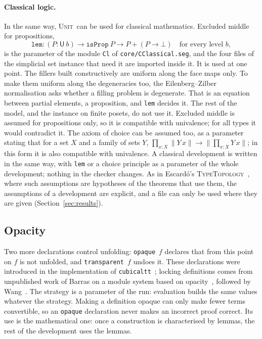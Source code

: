 \documentclass[11pt]{article}
\newcommand{\sys}{\textsc{Unit}}
\newcommand{\kw}[1]{\texttt{#1}}
\newcommand{\U}{\mathsf{U}}
\begin{document}
\paragraph{Classical logic.} In the same way, \sys\ can be used for
classical mathematics. Excluded middle for propositions,
\[
\kw{lem} : (P : \U\ b) \to \kw{isProp}\ P \to P + (P\to\bot)\quad
\text{for every level } b,
\]
is the parameter of the module \kw{Cl} of \texttt{core/CClassical.seg},
and the four files of the simplicial set instance that need it are
imported inside it.
It is used at one point. The fillers built constructively are uniform
along the face maps only. To make them uniform along the degeneracies
too, the Eilenberg--Zilber normalisation asks whether a filling problem
is degenerate. That is an equation between partial elements, a
proposition, and \kw{lem} decides it. The rest of the model, and the
instance on finite posets, do not use it. Excluded middle is assumed for
propositions only, so it is compatible with univalence; for all types
it would contradict it. The axiom of choice can be assumed too, as a parameter stating that for a set $X$ and a family of sets
$Y$, $\prod_{x:X}\lVert Y\,x\rVert\to\lVert\prod_{x:X}Y\,x\rVert$; in this
form it is also compatible with univalence. A classical development is written in the same
way, with \kw{lem} or a choice principle as a parameter of the whole
development; nothing in the checker changes. As in Escard\'o's
\textsc{TypeTopology}~\cite{TT}, where such assumptions are hypotheses
of the theorems that use them, the assumptions of a development are
explicit, and a file can only be used where they are given
(Section~\ref{sec:results}).

\subsection{Opacity}

Two more declarations control unfolding: \kw{opaque}~$f$ declares that
from this point on $f$ is not unfolded, and \kw{transparent}~$f$ undoes
it. These declarations were introduced in the implementation of
\texttt{cubicaltt}~\cite{cubicaltt}; locking definitions comes from
unpublished work of Barras on a module system based on
opacity~\cite{Barras}, followed by Wang~\cite{Wang}. The strategy is a parameter of the run:
evaluation builds the same values whatever the strategy. Making a
definition opaque can only make fewer terms convertible, so an
\kw{opaque} declaration never makes an incorrect proof correct. Its use
is the mathematical one: once a construction is characterised by lemmas,
the rest of the development uses the lemmas.
\end{document}
